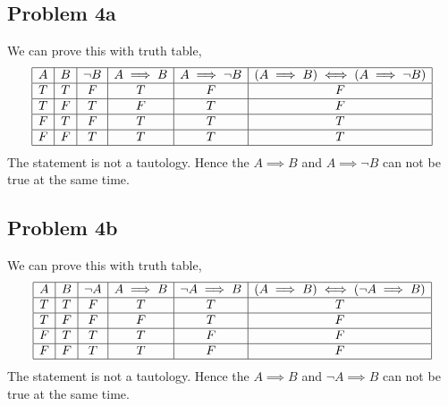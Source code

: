 \documentclass[answers]{exam}
\theoremstyle{mytheoremstyle}
\theoremstyle{mytheoremstyle}
\theoremstyle{myproblemstyle}
\begin{document}
\subsection*{Problem 4a}
\begin{framed}
	We can prove this with truth table,
	\begin{displaymath}
		\begin{array}{|c|c|c|c|c|c|}
			\hline
			A & B & \lnot B & A\implies B & A\implies\lnot B & (A\implies B) \iff(A\implies\lnot B) \\\hline
			T & T & F       & T           & F                & F                                    \\\hline
			T & F & T       & F           & T                & F                                    \\\hline
			F & T & F       & T           & T                & T                                    \\\hline
			F & F & T       & T           & T                & T                                    \\\hline
		\end{array}
	\end{displaymath}
	The statement is not a tautology. Hence the \(A\implies B\) and \(A\implies\lnot B\) can not be true at the same time.
\end{framed}

\subsection*{Problem 4b}
\begin{framed}
	We can prove this with truth table,
	\begin{displaymath}
		\begin{array}{|c|c|c|c|c|c|}
			\hline
			A & B & \lnot A & A\implies B & \lnot A\implies B & (A\implies B) \iff(\lnot A\implies B) \\\hline
			T & T & F       & T           & T                 & T                                     \\\hline
			T & F & F       & F           & T                 & F                                     \\\hline
			F & T & T       & T           & F                 & F                                     \\\hline
			F & F & T       & T           & F                 & F                                     \\\hline
		\end{array}
	\end{displaymath}
	The statement is not a tautology. Hence the \(A\implies B\) and \(\lnot A\implies B\) can not be true at the same time.
\end{framed}
\end{document}
